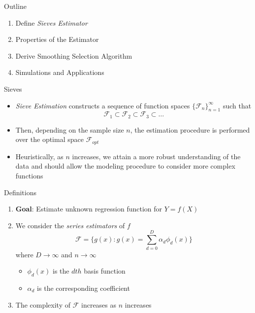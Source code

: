 \documentclass{beamer}
\begin{document}
\begin{frame}{Outline} %
\begin{enumerate}
\item Define \textit{Sieves Estimator}
\item Properties of the Estimator
\item Derive Smoothing Selection Algorithm
\item Simulations and Applications 
\end{enumerate}
\end{frame}

\begin{frame}{Sieves}%
\begin{itemize}
\item \textit{Sieve Estimation} constructs a sequence of function spaces $\{\mathcal{F}_n\}_{n=1}^{\infty}$ such that $$\mathcal{F}_1\subset\mathcal{F}_2\subset\mathcal{F}_3\subset\ldots$$
\item Then, depending on the sample size $n$, the estimation procedure is performed over the optimal space $\mathcal{F}_{opt}$
\item Heuristically, as $n$ increases, we attain a more robust understanding of the data and should allow the modeling procedure to consider more complex functions
\end{itemize}
\end{frame}
\begin{frame}{Definitions}%

\begin{enumerate}
\item \textbf{Goal}: Estimate unknown regression function for $Y = f(X)$
\item We consider the \textit{series estimators} of $f$ $$ \mathcal{F} = \Big\{g(x): g(x) = \sum_{d=0}^{D} \alpha_{d} \phi_{d}(x)\Big\}$$  where $D\to\infty$ and $n\to\infty$ \pause
\begin{itemize}
  \item $\phi_d(x)$ is the $dth$ basis function
  \item $\alpha_d$ is the corresponding coefficient  
  \end{itemize}
\item The complexity of $\mathcal{F}$ increases as $n$ increases
\end{enumerate}
\end{frame}
\end{document}
